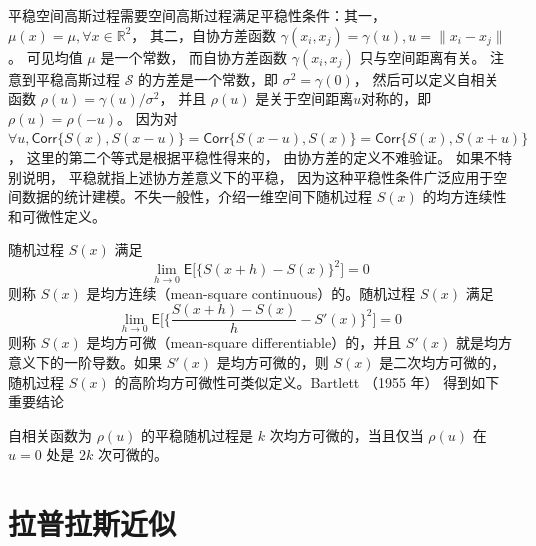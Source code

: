 \documentclass[12pt,a4paper,UTF8,twoside]{book}
\theoremstyle{definition}
\theoremstyle{definition}
\theoremstyle{definition}
\theoremstyle{remark}
\let\BeginKnitrBlock\begin \let\EndKnitrBlock\end
\begin{document}
平稳空间高斯过程需要空间高斯过程满足平稳性条件：其一，
\(\mu(x) = \mu, \forall x \in \mathbb{R}^2\)， 其二，自协方差函数
\(\gamma(x_i,x_j) = \gamma(u),u=\|x_{i} - x_{j}\|\)。 可见均值 \(\mu\)
是一个常数， 而自协方差函数 \(\gamma(x_i,x_j)\) 只与空间距离有关。
注意到平稳高斯过程 \(\mathcal{S}\) 的方差是一个常数，即
\(\sigma^2 = \gamma(0)\)， 然后可以定义自相关函数
\(\rho(u) = \gamma(u)/\sigma^2\)， 并且 \(\rho(u)\)
是关于空间距离\(u\)对称的，即 \(\rho(u) = \rho(-u)\)。 因为对
\(\forall u, \mathsf{Corr}\{S(x),S(x-u)\} = \mathsf{Corr}\{S(x-u), S(x)\} = \mathsf{Corr}\{S(x),S(x+u)\}\)，
这里的第二个等式是根据平稳性得来的， 由协方差的定义不难验证。
如果不特别说明， 平稳就指上述协方差意义下的平稳，
因为这种平稳性条件广泛应用于空间数据的统计建模。不失一般性，介绍一维空间下随机过程
\(S(x)\) 的均方连续性和可微性定义。

\BeginKnitrBlock{definition}[连续性和可微性]
\protect\hypertarget{def:continuous-differentiable}{}{\label{def:continuous-differentiable}
{} }随机过程 \(S(x)\) 满足
\[ \lim_{h \to 0} \mathsf{E}\big[ \{S(x + h) - S(x)\}^{2} \big] = 0 \]
\noindent 则称 \(S(x)\) 是均方连续（mean-square continuous）的。随机过程
\(S(x)\) 满足
\[ \lim_{h \to 0} \mathsf{E} \big[ \{ \frac{S(x+h) - S(x)}{h} - S'(x) \}^2 \big] = 0 \]
\noindent 则称 \(S(x)\) 是均方可微（mean-square differentiable）的，并且
\(S'(x)\) 就是均方意义下的一阶导数。如果 \(S'(x)\) 是均方可微的，则
\(S(x)\) 是二次均方可微的，随机过程 \(S(x)\)
的高阶均方可微性可类似定义\citep{Diggle2007}。Bartlett （1955 年）
\citep{Bartlett1955} 得到如下重要结论
\EndKnitrBlock{definition}

\BeginKnitrBlock{theorem}[平稳随机过程的可微性]
\protect\hypertarget{thm:stationary-mean-square-properties}{}{\label{thm:stationary-mean-square-properties}
{} }自相关函数为 \(\rho(u)\)
的平稳随机过程是 \(k\) 次均方可微的，当且仅当 \(\rho(u)\) 在 \(u = 0\)
处是 \(2k\) 次可微的。
\EndKnitrBlock{theorem}

\hypertarget{sec:Laplace-approximation}{%
\section{拉普拉斯近似}\label{sec:Laplace-approximation}}
\end{document}
